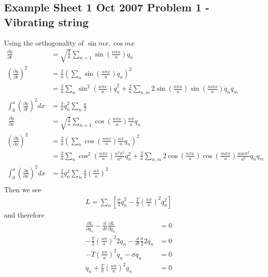 \documentclass[10pt,a4paper]{book}
\theoremstyle{definition}
\begin{document}
\subsection{Example Sheet 1 Oct 2007 Problem 1 - Vibrating string}
Using the orthogonality of $\sin mx, \cos mx$
\begin{align}
\frac{\partial y}{\partial t}
&=\sqrt{\frac{2}{a}}\sum_{n=1}\sin\left(\frac{n\pi x}{a}\right)\dot{q}_n\\
\left(\frac{\partial y}{\partial t}\right)^2
&=\frac{2}{a}\left(\sum_n\sin\left(\frac{n\pi x}{a}\right)\dot{q}_n\right)^2\\
&=\frac{2}{a}\sum_{n}\sin^2\left(\frac{n\pi x}{a}\right)\dot{q}_n^2+\frac{2}{a}\sum_{n,m}2\sin\left(\frac{n\pi x}{a}\right)\sin\left(\frac{m\pi x}{a}\right)\dot{q}_n\dot{q}_m\\
\int_0^a \left(\frac{\partial y}{\partial t}\right)^2dx
&=\frac{2}{a}\dot{q}_n^2\sum_{n}\frac{a}{2}\\\
%
\frac{\partial y}{\partial x}
&=\sqrt{\frac{2}{a}}\sum_{n=1}\cos\left(\frac{n\pi x}{a}\right)\frac{n\pi}{a}q_n\\
\left(\frac{\partial y}{\partial x}\right)^2
&=\frac{2}{a}\left(\sum_n\cos\left(\frac{n\pi x}{a}\right)\frac{n\pi}{a}q_n\right)^2\\
&=\frac{2}{a}\sum_n\cos^2\left(\frac{n\pi x}{a}\right)\frac{n^2\pi^2}{a^2}q_n^2+\frac{2}{a}\sum_{n,m}2\cos\left(\frac{n\pi x}{a}\right)\cos\left(\frac{m\pi x}{a}\right)\frac{nm\pi^2}{a^2}q_nq_m\\
\int_0^a \left(\frac{\partial y}{\partial x}\right)^2dx
&=\frac{2}{a}q_n^2\sum_{n}\frac{a}{2}\left(\frac{n\pi}{a}\right)^2\\\
\end{align}
Then we see
\begin{align}
L=\sum_{n}\left[\frac{\sigma}{2}\dot{q}_n^2-\frac{T}{2}\left(\frac{n\pi}{a}\right)^2q_n^2\right]
\end{align}
and therefore
\begin{align}
\frac{\partial L}{\partial q_n}-\frac{d}{dt}\frac{\partial L}{\partial \dot{q}_n}&=0\\
-\frac{T}{2}\left(\frac{n\pi}{a}\right)^2 2q_n-\frac{d}{dt}\frac{\sigma}{2}2\dot{q}_n&=0\\
-T\left(\frac{n\pi}{a}\right)^2 q_n-\sigma\ddot{q}_n&=0\\
\ddot{q}_n+\frac{T}{\sigma}\left(\frac{n\pi}{a}\right)^2q_n&=0
\end{align}
\end{document}
